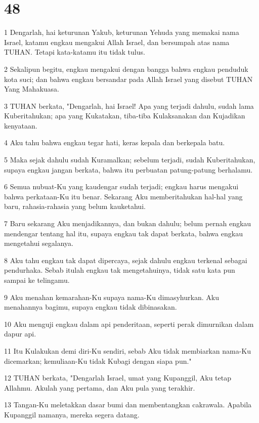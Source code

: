 \chapter{48}

\par 1 Dengarlah, hai keturunan Yakub, keturunan Yehuda yang memakai nama Israel, katamu engkau mengakui Allah Israel, dan bersumpah atas nama TUHAN. Tetapi kata-katamu itu tidak tulus.
\par 2 Sekalipun begitu, engkau mengakui dengan bangga bahwa engkau penduduk kota suci; dan bahwa engkau bersandar pada Allah Israel yang disebut TUHAN Yang Mahakuasa.
\par 3 TUHAN berkata, "Dengarlah, hai Israel! Apa yang terjadi dahulu, sudah lama Kuberitahukan; apa yang Kukatakan, tiba-tiba Kulaksanakan dan Kujadikan kenyataan.
\par 4 Aku tahu bahwa engkau tegar hati, keras kepala dan berkepala batu.
\par 5 Maka sejak dahulu sudah Kuramalkan; sebelum terjadi, sudah Kuberitahukan, supaya engkau jangan berkata, bahwa itu perbuatan patung-patung berhalamu.
\par 6 Semua nubuat-Ku yang kaudengar sudah terjadi; engkau harus mengakui bahwa perkataan-Ku itu benar. Sekarang Aku memberitahukan hal-hal yang baru, rahasia-rahasia yang belum kauketahui.
\par 7 Baru sekarang Aku menjadikannya, dan bukan dahulu; belum pernah engkau mendengar tentang hal itu, supaya engkau tak dapat berkata, bahwa engkau mengetahui segalanya.
\par 8 Aku tahu engkau tak dapat dipercaya, sejak dahulu engkau terkenal sebagai pendurhaka. Sebab itulah engkau tak mengetahuinya, tidak satu kata pun sampai ke telingamu.
\par 9 Aku menahan kemarahan-Ku supaya nama-Ku dimasyhurkan. Aku menahannya bagimu, supaya engkau tidak dibinasakan.
\par 10 Aku menguji engkau dalam api penderitaan, seperti perak dimurnikan dalam dapur api.
\par 11 Itu Kulakukan demi diri-Ku sendiri, sebab Aku tidak membiarkan nama-Ku dicemarkan; kemuliaan-Ku tidak Kubagi dengan siapa pun."
\par 12 TUHAN berkata, "Dengarlah Israel, umat yang Kupanggil, Aku tetap Allahmu. Akulah yang pertama, dan Aku pula yang terakhir.
\par 13 Tangan-Ku meletakkan dasar bumi dan membentangkan cakrawala. Apabila Kupanggil namanya, mereka segera datang.
